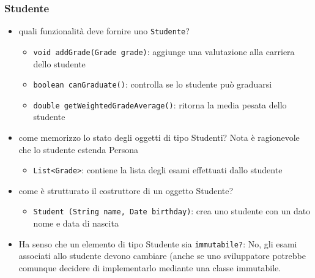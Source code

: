 \documentclass{article}
\begin{document}
\subsubsection{Studente}
\begin{itemize}
\item quali funzionalit\`a deve fornire uno \texttt{Studente}?
\begin{itemize}
\item \texttt{void addGrade(Grade grade)}: aggiunge una valutazione alla carriera dello studente
\item \texttt{boolean canGraduate()}: controlla se lo studente pu\`o graduarsi
\item \texttt{double getWeightedGradeAverage()}: ritorna la media pesata dello studente
\end{itemize}
\item come memorizzo lo stato degli oggetti di tipo Studenti? Nota \`e ragionevole che lo studente estenda Persona
\begin{itemize}
\item \texttt{List<Grade>}: contiene la lista degli esami effettuati dallo studente
\end{itemize}
\item come \`e strutturato il costruttore di un oggetto Studente?
\begin{itemize}
\item \texttt{Student (String name, Date birthday)}: crea uno studente con un dato nome e data di nascita
\end{itemize}
\item Ha senso che un elemento di tipo Studente sia \texttt{immutabile?}: No, gli esami associati allo studente devono cambiare (anche se uno sviluppatore potrebbe comunque decidere di implementarlo mediante una classe immutabile.
\end{itemize}
\end{document}
